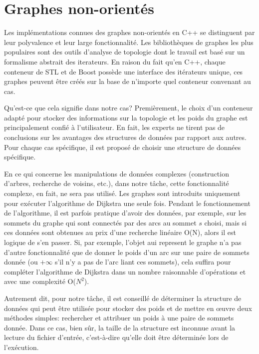 \documentclass[12pt]{article}
\begin{document}
	\section{Graphes non-orientés}
	
	Les implémentations connues des graphes non-orientés en C++ se distinguent par leur polyvalence et leur large fonctionnalité. Les bibliothèques de graphes les plus populaires sont des outils d'analyse de topologie dont le travail est basé sur un formalisme abstrait des iterateurs. En raison du fait qu'en C++, chaque conteneur de STL et de Boost possède une interface des itérateurs unique, ces graphes peuvent être créés sur la base de n'importe quel conteneur convenant au cas.
	
	Qu'est-ce que cela signifie dans notre cas? Premièrement, le choix d'un conteneur adapté pour stocker des informations sur la topologie et les poids du graphe est principalement confié à l'utilisateur. En fait, les experts ne tirent pas de conclusions sur les avantages des structures de données par rapport aux autres. Pour chaque cas spécifique, il est proposé de choisir une structure de données spécifique.
	
	En ce qui concerne les manipulations de données complexes (construction d'arbres, recherche de voisins, etc.), dans notre tâche, cette fonctionnalité complexe, en fait, ne sera pas utilisé. Les graphes sont introduits uniquement pour exécuter l'algorithme de Dijkstra une seule fois. Pendant le fonctionnement de l'algorithme, il est parfois pratique d'avoir des données, par exemple, sur les sommets du graphe qui sont connectés par des arcs au sommet $s$ choisi, mais si ces données sont obtenues au prix d'une recherche linéaire O(N), alors il est logique de s'en passer. Si, par exemple, l'objet aui represent le graphe n'a pas d'autre fonctionnalité que de donner le poids d'un arc sur une paire de sommets donnée (ou $+\infty$ s'il n'y a pas de l'arc liant ces sommets), cela suffira pour compléter l'algorithme de Dijkstra dans un nombre raisonnable d'opérations et avec une complexité O($N^2$).
	
	Autrement dit, pour notre tâche, il est conseillé de déterminer la structure de données qui peut être utilisée pour stocker des poids et de mettre en œuvre deux méthodes simples: rechercher et attribuer un poids à une paire de sommets donnée. Dans ce cas, bien sûr, la taille de la structure est inconnue avant la lecture du fichier d'entrée, c'est-à-dire qu'elle doit être déterminée lors de l'exécution.
	
\end{document}
